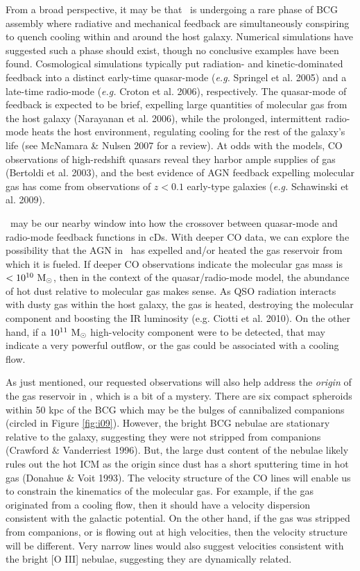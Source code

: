 \documentclass[11pt]{article}
\begin{document}
From a broad perspective, it may be that \irs\ is undergoing a rare
phase of BCG assembly where radiative and mechanical feedback are
simultaneously conspiring to quench cooling within and around the host
galaxy. Numerical simulations have suggested such a phase should
exist, though no conclusive examples have been found. Cosmological
simulations typically put radiation- and kinetic-dominated feedback
into a distinct early-time quasar-mode ({\it{e.g.}} Springel et
al. 2005) and a late-time radio-mode ({\it{e.g.}} Croton et al. 2006),
respectively. The quasar-mode of feedback is expected to be brief,
expelling large quantities of molecular gas from the host galaxy
(Narayanan et al. 2006), while the prolonged, intermittent radio-mode
heats the host environment, regulating cooling for the rest of the
galaxy's life (see McNamara \& Nulsen 2007 for a review). At odds with
the models, CO observations of high-redshift quasars reveal they
harbor ample supplies of gas (Bertoldi et al. 2003), and the best
evidence of AGN feedback expelling molecular gas has come from
observations of $z < 0.1$ early-type galaxies ({\it{e.g.}} Schawinski
et al. 2009).

\irs\ may be our nearby window into how the crossover between
quasar-mode and radio-mode feedback functions in cDs. With deeper CO
data, we can explore the possibility that the AGN in \irs\ has
expelled and/or heated the gas reservoir from which it is fueled. If
deeper CO observations indicate the molecular gas mass is $< 10^{10}
~\mathrm{M}_{\odot}$, then in the context of the quasar/radio-mode model, the
abundance of hot dust relative to molecular gas makes sense. As QSO
radiation interacts with dusty gas within the host galaxy, the gas is
heated, destroying the molecular component and boosting the IR
luminosity (e.g. Ciotti et al. 2010). On the other hand, if a $10^{11}
~\mathrm{M}_{\odot}$ high-velocity component were to be detected, that may indicate
a very powerful outflow, or the gas could be associated with a cooling
flow.

As just mentioned, our requested observations will also help address
the {\it{origin}} of the gas reservoir in \irs, which is a bit of a
mystery. There are six compact spheroids within 50 kpc of the BCG
which may be the bulges of cannibalized companions (circled in Figure
\ref{fig:i09}). However, the bright BCG nebulae are stationary
relative to the galaxy, suggesting they were not stripped from
companions (Crawford \& Vanderriest 1996). But, the large dust content
of the nebulae likely rules out the hot ICM as the origin since dust
has a short sputtering time in hot gas (Donahue \& Voit 1993). The
velocity structure of the CO lines will enable us to constrain the
kinematics of the molecular gas. For example, if the gas originated
from a cooling flow, then it should have a velocity dispersion
consistent with the galactic potential. On the other hand, if the gas
was stripped from companions, or is flowing out at high velocities,
then the velocity structure will be different. Very narrow lines would
also suggest velocities consistent with the bright [O III] nebulae,
suggesting they are dynamically related.
\end{document}
